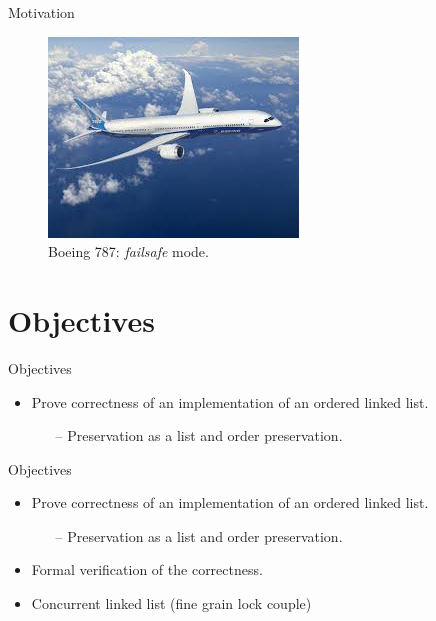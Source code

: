\documentclass[10pt,notes,compress,usetitleprogressbar,aspectratio=1610]{beamer}
\begin{document}
\begin{frame}{Motivation}
	\begin{figure}
		\centering
		\includegraphics[scale=0.8]{imgs/boeing.jpg}
		\caption{Boeing 787: \textit{failsafe} mode.}
	\end{figure}
\end{frame}

\section{Objectives}

\begin{frame}{Objectives}
\begin{itemize}
	\item Prove correctness of an implementation of an ordered linked list.
	\begin{itemize}
		\item[--] Preservation as a list and order preservation.
	\end{itemize}
	\begin{figure}
		
	\end{figure}
	\item[]
	\item[]
\end{itemize}
\end{frame}

\begin{frame}{Objectives}
\begin{itemize}
	\item Prove correctness of an implementation of an ordered linked list.
	\begin{itemize}
		\item[--] Preservation as a list and order preservation.
	\end{itemize}
	\begin{figure}
		
	\end{figure}
	\item  Formal verification of the correctness.
	\item Concurrent linked list (fine grain lock couple)
\end{itemize}
\end{frame}
\end{document}
